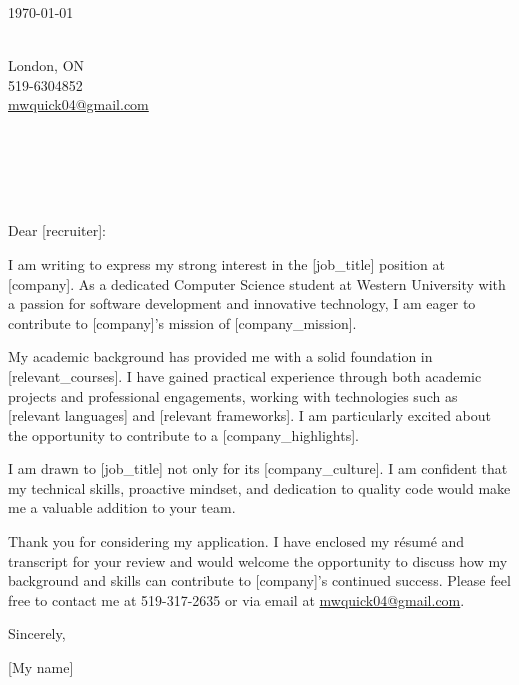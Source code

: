 \documentclass[11pt]{article}
\begin{document}
\begin{flushright}
\today
\end{flushright}

\noindent [My name] \\
London, ON \\
519-6304852 \\
\href{mailto:mwquick04@gmail.com}{mwquick04@gmail.com} \\

\vspace{1em}

\noindent [company] \\
[recruiter position (skip if none are provided)] \\
[recruiter (skip if none are provided)] \\
[company location] \\

\vspace{1em}

\noindent Dear [recruiter]:

\setlength{\parindent}{15pt}
\setlength{\parskip}{0.75em}

I am writing to express my strong interest in the [job_title] position at [company]. As a dedicated Computer Science student at Western University with a passion for software development and innovative technology, I am eager to contribute to [company]’s mission of [company_mission].

My academic background has provided me with a solid foundation in [relevant_courses]. I have gained practical experience through both academic projects and professional engagements, working with technologies such as [relevant languages] and [relevant frameworks]. I am particularly excited about the opportunity to contribute to a [company_highlights].

I am drawn to [job_title] not only for its [company_culture]. I am confident that my technical skills, proactive mindset, and dedication to quality code would make me a valuable addition to your team.

Thank you for considering my application. I have enclosed my résumé and transcript for your review and would welcome the opportunity to discuss how my background and skills can contribute to [company]’s continued success. Please feel free to contact me at 519-317-2635 or via email at \href{mailto:mwquick04@gmail.com}{mwquick04@gmail.com}.

\setlength{\parindent}{0pt}

\vspace{1em}
Sincerely,

\vspace{1em}
[My name]
\end{document}

